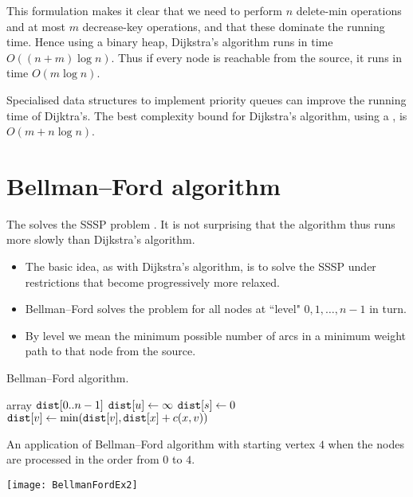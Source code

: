 This formulation makes it clear that we need to perform $n$
delete-min operations and at most $m$ decrease-key operations, and
that these dominate the running time. Hence using a binary heap, Dijkstra's
algorithm runs in time $O((n + m) \log n)$. 
Thus if every node is reachable from the source, it runs in time $O(m \log n)$.

Specialised data structures to implement priority queues can improve the running time of Dijktra's.
The best complexity bound for Dijkstra's algorithm, using a , is $O(m + n\log n)$.

\section{Bellman--Ford algorithm} \label{sec:bellford}
The  solves the SSSP problem . 
It is not surprising that the algorithm thus runs more slowly than Dijkstra's algorithm. 
\begin{itemize}
  \item The basic idea, as with Dijkstra's algorithm, is to solve the SSSP under restrictions that become progressively more relaxed. 
  \item Bellman--Ford solves the problem for all nodes at ``level" $0, 1, \dots , n-1$ in turn.
  \item By level we mean the minimum possible number of arcs in a minimum weight path to that node from the source.
\end{itemize}

\begin{algorithm}[H]
  \caption{Bellman--Ford algorithm.}
  \label{alg:bellford-code}
\begin{algorithmic}[1]
	\State array $\operatorname{\text{\texttt{dist}}}[0..n-1]$
		\State $\operatorname{\text{\texttt{dist}}}[u] \gets \infty$ 
	\EndFor
	\State $\operatorname{\text{\texttt{dist}}}[s] \gets 0$
				\State $\operatorname{\text{\texttt{dist}}}[v] \gets \min( \operatorname{\text{\texttt{dist}}}[v], \operatorname{\text{\texttt{dist}}}[x] + c(x,v) )$
			\EndFor
		\EndFor
	\EndFor
	\State \Return{$\dist$}
\EndFunction
\end{algorithmic}
\end{algorithm}

\begin{Boxample}[0]
An application of Bellman--Ford algorithm with starting vertex $4$
when the nodes are processed in the order from $0$ to $4$.
\begin{center} 
  \texttt{[image: BellmanFordEx2]}
\end{center}
\end{Boxample}

